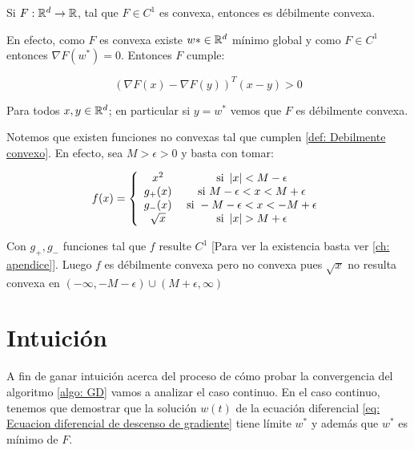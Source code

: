 \begin{remark}
	Si  $F: {\mathbb{R}}^d \rightarrow {\mathbb{R}}$, tal que $F \in C^1$ es convexa, entonces es d\'ebilmente convexa.
	
	En efecto, como $F$ es convexa existe $w* \in {\mathbb{R}}^d$ m\'inimo global y como $F \in C^1$ entonces $\nabla F(w^*) = 0$. Entonces $F$ cumple:
	
	\begin{equation*}
		\left(\nabla F(x) - \nabla F(y)\right)^T \left(x-y\right) >0
	\end{equation*}
	
	Para todos $x,y \in {\mathbb{R}}^d$; en particular si $y = w^*$ vemos que $F$ es d\'ebilmente convexa.
	
\end{remark}

\begin{remark}
	Notemos que existen funciones no convexas tal que cumplen \ref{def: Debilmente convexo}. En efecto, sea $M > \epsilon >0$ y basta con tomar:
	
	\begin{equation*}
	f(x) = \left\lbrace \begin{array}{cc}
	x^2 & \text{ si } \left\lvert x\right\rvert< M - \epsilon \\
	g_+(x) & \text{ si } M - \epsilon <  x < M + \epsilon \\
	g_-(x) & \text{ si } -M - \epsilon < x < -M + \epsilon \\
	\sqrt{x} & \text{ si } \left\lvert x\right\rvert > M+ \epsilon
	\end{array} \right.
	\end{equation*}
	
	Con $g_+,g_-$ funciones tal que $f$ resulte $C^1$ [Para ver la existencia basta ver \ref{ch: apendice}]. Luego $f$ es d\'ebilmente convexa pero no convexa pues $\sqrt{x}$ no resulta convexa en $\left(- \infty, -M - \epsilon \right) \cup \left(M + \epsilon , \infty\right)$
	
\end{remark}

\section{Intuici\'on}\label{section: Intuicion convergencia puntual batch}

A fin de ganar intuici\'on acerca del proceso de c\'omo probar la convergencia del algoritmo \ref{algo: GD} vamos a analizar el caso continuo. En el caso continuo, tenemos que demostrar que la soluci\'on $w(t)$ de la ecuaci\'on diferencial \ref{eq: Ecuacion diferencial de descenso de gradiente} tiene l\'imite $w^*$ y adem\'as que $w^*$ es m\'inimo de $F$.

